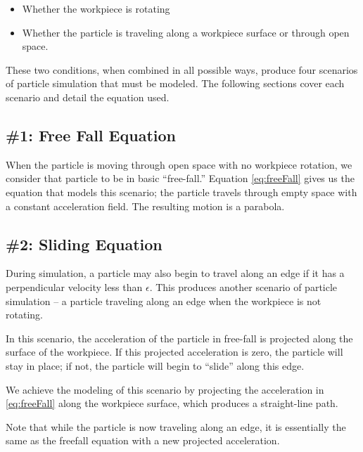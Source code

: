 \begin{itemize}
	\item Whether the workpiece is rotating
	\item Whether the particle is traveling along a workpiece surface or through open space.
\end{itemize}

These two conditions, when combined in all possible ways, produce four scenarios of particle simulation that must be modeled. The following sections cover each scenario and detail the equation used.

		\subsection{\#1: Free Fall Equation}

When the particle is moving through open space with no workpiece rotation, we consider that particle to be in basic ``free-fall.'' Equation \eqref{eq:freeFall} gives us the equation that models this scenario; the particle travels through empty space with a constant acceleration field. The resulting motion is a parabola.


		\subsection{\#2: Sliding Equation}

During simulation, a particle may also begin to travel along an edge if it has a perpendicular velocity less than $\epsilon$. This produces another scenario of particle simulation -- a particle traveling along an edge when the workpiece is not rotating.


In this scenario, the acceleration of the particle in free-fall is projected along the surface of the workpiece. If this projected acceleration is zero, the particle will stay in place; if not, the particle will begin to ``slide'' along this edge.

We achieve the modeling of this scenario by projecting the acceleration in \eqref{eq:freeFall} along the workpiece surface, which produces a straight-line path.

Note that while the particle is now traveling along an edge, it is essentially the same as the freefall equation with a new projected acceleration.


